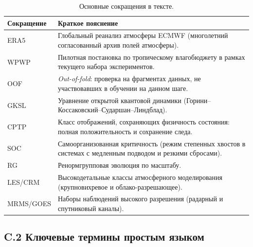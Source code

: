 \documentclass[11pt,a4paper]{article}
\theoremstyle{definition}
\theoremstyle{plain}
\theoremstyle{remark}
\begin{document}
\begin{table}[H]
\centering
\caption{Основные сокращения в тексте.}
\label{tab:appendix_c_abbr}
\small
\begin{tabular}{@{}p{2.8cm}p{11.2cm}@{}}
\toprule
Сокращение & Краткое пояснение \\
\midrule
ERA5 & Глобальный реанализ атмосферы ECMWF (многолетний согласованный архив полей атмосферы). \\
WPWP & Пилотная постановка по тропическому влагобюджету в рамках текущего набора экспериментов. \\
OOF & \textit{Out-of-fold}: проверка на фрагментах данных, не участвовавших в обучении на данном шаге. \\
GKSL & Уравнение открытой квантовой динамики (Горини--Коссаковский--Сударшан--Линдблад). \\
CPTP & Класс отображений, сохраняющих физичность состояния: полная положительность и сохранение следа. \\
SOC & Самоорганизованная критичность (режим степенных хвостов в системах с медленным подводом и резкими сбросами). \\
RG & Ренормгрупповая эволюция по масштабу. \\
LES/CRM & Высокодетальные классы атмосферного моделирования (крупновихревое и облако-разрешающее). \\
MRMS/GOES & Наборы наблюдений высокого разрешения (радарный и спутниковый каналы). \\
\bottomrule
\end{tabular}
\end{table}

\subsection*{C.2 Ключевые термины простым языком}
\end{document}
